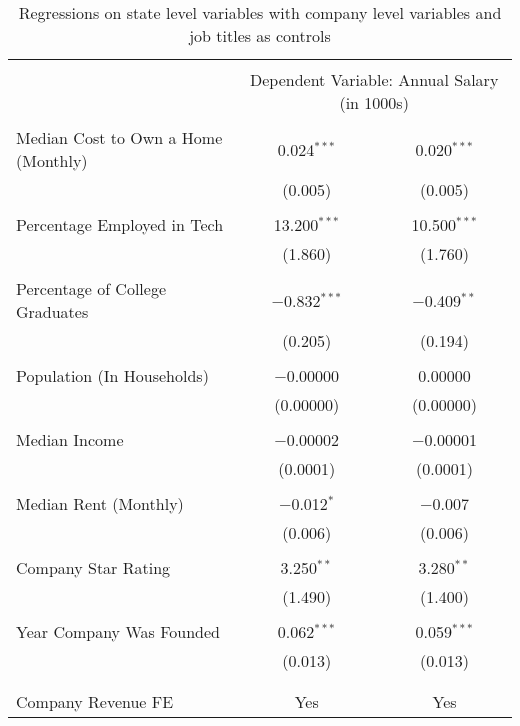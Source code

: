 
\begin{table}[!htbp] \centering 
  \caption{Regressions on state level variables with company level 
          variables and job titles as controls} 
  \label{} 
\footnotesize 
\begin{tabular}{@{\extracolsep{5pt}}lcc} 
\\[-1.8ex]\hline 
\hline \\[-1.8ex] 
 & \multicolumn{2}{c}{Dependent Variable: Annual Salary (in 1000s)} \\ 
\cline{2-3} 
\hline \\[-1.8ex] 
 Median Cost to Own a Home (Monthly) & 0.024$^{***}$ & 0.020$^{***}$ \\ 
  & (0.005) & (0.005) \\ 
  & & \\ 
 Percentage Employed in Tech & 13.200$^{***}$ & 10.500$^{***}$ \\ 
  & (1.860) & (1.760) \\ 
  & & \\ 
 Percentage of College Graduates & $-$0.832$^{***}$ & $-$0.409$^{**}$ \\ 
  & (0.205) & (0.194) \\ 
  & & \\ 
 Population (In Households) & $-$0.00000 & 0.00000 \\ 
  & (0.00000) & (0.00000) \\ 
  & & \\ 
 Median Income & $-$0.00002 & $-$0.00001 \\ 
  & (0.0001) & (0.0001) \\ 
  & & \\ 
 Median Rent (Monthly) & $-$0.012$^{*}$ & $-$0.007 \\ 
  & (0.006) & (0.006) \\ 
  & & \\ 
 Company Star Rating & 3.250$^{**}$ & 3.280$^{**}$ \\ 
  & (1.490) & (1.400) \\ 
  & & \\ 
 Year Company Was Founded & 0.062$^{***}$ & 0.059$^{***}$ \\ 
  & (0.013) & (0.013) \\ 
  & & \\ 
\hline \\[-1.8ex] 
Company Revenue FE & Yes & Yes \\ 

\end{tabular}
\end{table}
